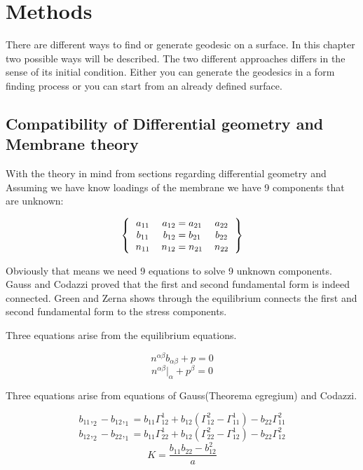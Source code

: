 \chapter{Methods}



There are different ways to find or generate geodesic on a surface. In this chapter two possible ways will be described. The two different approaches differs in the sense of its initial condition. Either you can generate the geodesics in a form finding process or you can start from an already defined surface.



\section{Compatibility of Differential geometry and Membrane theory}

With the theory in mind from sections regarding differential geometry and 
Assuming we have know loadings of the membrane we have 9 components that are unknown:

\[ 
\left \{
  \begin{tabular}{ccc}
  $a_{11}$  & $a_{12} =a_{21} $ & $a_{22}$ \\
 $b_{11}$  & $b_{12} =b_{21} $ & $b_{22}$\\
  $n_{11}$  & $n_{12} =n_{21} $ & $n_{22}$ 
  \end{tabular}
\right \}
\]

\vspace{5mm}
Obviously that means we need 9 equations to solve 9 unknown components. Gauss and Codazzi proved that the first and second fundamental form is indeed connected. Green and Zerna shows through the equilibrium connects the first and second fundamental form to the stress components. 
\vspace{5mm}

Three equations arise from the equilibrium equations.

$$n^{\alpha \beta}b_{\alpha \beta} + p = 0$$
$$n^{\alpha \beta}|_\alpha + p^\beta = 0$$

Three equations arise from equations of Gauss(Theorema egregium) and Codazzi.


$$ b_{11},_2 - b_{12},_1 = b_{11} \Gamma^1_{12} + b_{12}(\Gamma^2_{12} - \Gamma^1_{11}) - b_{22}\Gamma^2_{11} $$
$$   b_{12},_2 - b_{22},_1 = b_{11} \Gamma^1_{22} + b_{12}(\Gamma^2_{22} - \Gamma^1_{12}) - b_{22}\Gamma^2_{12} $$
$$  K= \frac{b_{11}b_{22}-b^2_{12}}{a}$$

